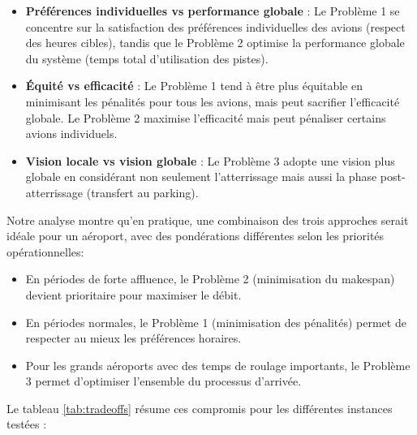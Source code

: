 \documentclass[a4paper,12pt]{report}
\begin{document}
\begin{itemize}
  \item \textbf{Préférences individuelles vs performance globale} : Le Problème 1 se concentre sur la satisfaction des préférences individuelles des avions (respect des heures cibles), tandis que le Problème 2 optimise la performance globale du système (temps total d'utilisation des pistes).
  
  \item \textbf{Équité vs efficacité} : Le Problème 1 tend à être plus équitable en minimisant les pénalités pour tous les avions, mais peut sacrifier l'efficacité globale. Le Problème 2 maximise l'efficacité mais peut pénaliser certains avions individuels.
  
  \item \textbf{Vision locale vs vision globale} : Le Problème 3 adopte une vision plus globale en considérant non seulement l'atterrissage mais aussi la phase post-atterrissage (transfert au parking).
\end{itemize}

Notre analyse montre qu'en pratique, une combinaison des trois approches serait idéale pour un aéroport, avec des pondérations différentes selon les priorités opérationnelles:

\begin{itemize}
  \item En périodes de forte affluence, le Problème 2 (minimisation du makespan) devient prioritaire pour maximiser le débit.
  \item En périodes normales, le Problème 1 (minimisation des pénalités) permet de respecter au mieux les préférences horaires.
  \item Pour les grands aéroports avec des temps de roulage importants, le Problème 3 permet d'optimiser l'ensemble du processus d'arrivée.
\end{itemize}

Le tableau \ref{tab:tradeoffs} résume ces compromis pour les différentes instances testées :
\end{document}
